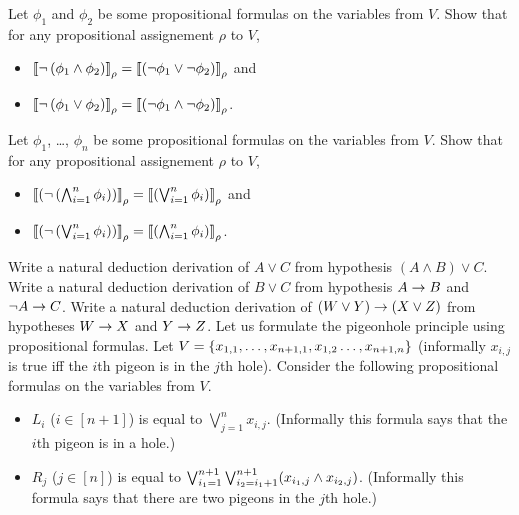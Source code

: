 \begin{chapterendexercises}
  \exercise %
    Let $\phi_1$ and $\phi_2$ be some propositional formulas on
    the variables from $V$. Show that for any propositional assignement
    $\rho$ to $V$,
    \begin{itemize}
      \item
        $\left\llbracket {
        \lnot\left(
          \phi_1 \land \phi_2
        \right)} \right\rrbracket_{\rho} =
        \left\llbracket {
          \left(
            \lnot \phi_1 \lor \lnot \phi_2
          \right)
         } \right\rrbracket_{\rho}$ and
    \item
    $\left\llbracket {
    \lnot\left(
      \phi_1 \lor \phi_2
    \right)} \right\rrbracket_{\rho} =
    \left\llbracket {
      \left(
        \lnot \phi_1 \land \lnot \phi_2
      \right)
     } \right\rrbracket_{\rho}$.
  \end{itemize}
  \exercise %
    Let $\phi_1$, \dots, $\phi_n$ be some propositional formulas on
    the variables from $V$. Show that for any propositional assignement
    $\rho$ to $V$,
    \begin{itemize}
      \item
        $\left\llbracket {
          \left(
            \lnot \left(
                    \bigwedge_{i = 1}^n \phi_i
                  \right)
          \right)} \right\rrbracket_{\rho} =
          \left\llbracket {
            \left(
              \bigvee_{i = 1}^n \phi_i
            \right)
           } \right\rrbracket_{\rho}$ and
      \item
        $\left\llbracket {
         \left(
           \lnot \left(
                   \bigvee_{i = 1}^n \phi_i
                 \right)
         \right)} \right\rrbracket_{\rho} =
         \left\llbracket {
           \left(
             \bigwedge_{i = 1}^n \phi_i
           \right)
          } \right\rrbracket_{\rho}$.
    \end{itemize}
  \exercise  Write a natural deduction derivation of $A \lor C$ from
    hypothesis $(A \land B) \lor C$.
  \exercise Write a natural deduction derivation of $B \lor C$ from
    hypothesis $A \rightarrow B$ and $\lnot A \rightarrow C$.
  \exercise Write a natural deduction derivation of
    $(W \lor Y) \rightarrow (X \lor Z)$ from
    hypotheses $W \rightarrow X$ and $Y \rightarrow Z$.
  \exercise Let us formulate the pigeonhole principle using propositional
    formulas. Let
    $V = \set{x_{1, 1}, \dots, x_{n + 1, 1}, x_{1, 2} \dots, x_{n + 1, n}}$
    (informally $x_{i, j}$ is true iff the $i$th pigeon is in the $j$th hole).
    Consider the following propositional formulas on the variables from
    $V$.
    \begin{itemize}
      \item $L_i$ ($i \in [n + 1]$) is equal to $\bigvee_{j = 1}^n x_{i, j}$.
        (Informally this formula says that the $i$th pigeon is in a hole.)
      \item $R_j$ ($j \in [n]$) is equal to
        $\bigvee_{i_1 = 1}^{n + 1} \bigvee_{i_2 = i_1 + 1}^{n + 1}
        (x_{i_1, j} \land x_{i_2, j})$.
        (Informally this formula says that there are two pigeons in the $j$th
        hole.)
      \end{itemize}


\end{chapterendexercises}
